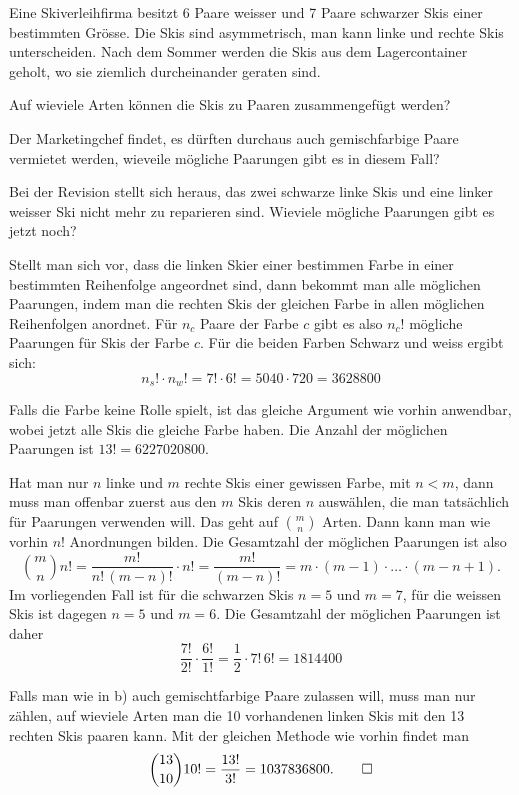 Eine Skiverleihfirma besitzt 6 Paare weisser und 7 Paare schwarzer Skis
einer bestimmten Grösse. Die Skis sind asymmetrisch, man kann linke
und rechte Skis unterscheiden.
Nach dem Sommer werden die Skis aus dem Lagercontainer geholt, 
wo sie ziemlich durcheinander geraten sind.
\begin{teilaufgaben}
\item Auf wieviele Arten können die Skis zu Paaren zusammengefügt werden?
\item Der Marketingchef findet, es dürften durchaus auch gemischfarbige Paare
vermietet werden, wieveile mögliche Paarungen gibt es in diesem
Fall?
\item Bei der Revision stellt sich heraus, das zwei schwarze linke Skis
und eine linker weisser Ski nicht mehr zu reparieren sind. Wieviele
mögliche Paarungen gibt es jetzt noch?
\end{teilaufgaben}

\begin{loesung}
\begin{teilaufgaben}
\item Stellt man sich vor, dass die linken Skier einer bestimmen
Farbe in einer bestimmten
Reihenfolge angeordnet sind, dann bekommt man alle möglichen Paarungen,
indem man die rechten Skis der gleichen Farbe in allen möglichen
Reihenfolgen anordnet.
Für $n_c$ Paare der Farbe $c$ gibt es also $n_c!$ mögliche
Paarungen für Skis der Farbe $c$. Für die beiden Farben Schwarz
und weiss ergibt sich:
\[
n_s!\cdot n_w!=7!\cdot 6!=5040\cdot 720=3628800
\]
\item
Falls die Farbe keine Rolle spielt, ist das gleiche Argument wie vorhin
anwendbar, wobei jetzt alle Skis die gleiche Farbe haben. Die Anzahl
der möglichen Paarungen ist $13!=6227020800$.
\item
Hat man nur $n$ linke und $m$ rechte Skis einer gewissen Farbe, mit $n<m$,
dann muss man offenbar zuerst aus den $m$ Skis deren $n$ auswählen,
die man tatsächlich für Paarungen verwenden will. Das geht auf $\binom{m}{n}$
Arten. Dann kann man wie vorhin $n!$ Anordnungen bilden. Die Gesamtzahl
der möglichen Paarungen ist also 
\[
\binom{m}{n}n!=\frac{m!}{n!\,(m-n)!}\cdot n!=\frac{m!}{(m-n)!}
=
m\cdot(m-1)\cdot\dots\cdot(m-n+1).
\]
Im vorliegenden Fall ist für die schwarzen Skis $n=5$ und $m=7$,
für die weissen Skis ist dagegen $n=5$ und $m=6$.
Die Gesamtzahl der möglichen Paarungen ist daher
\[
\frac{7!}{2!}\cdot \frac{6!}{1!}
=\frac12\cdot 7!\,6!=1814400
\]
\end{teilaufgaben}
Falls man wie in b) auch gemischtfarbige Paare zulassen will, muss
man nur zählen, auf wieviele Arten man die 10 vorhandenen
linken Skis mit den 13 rechten Skis paaren kann. Mit der gleichen
Methode wie vorhin findet man
\[
\binom{13}{10}10!=\frac{13!}{3!}=1037836800.
\qedhere
\]
\end{loesung}

